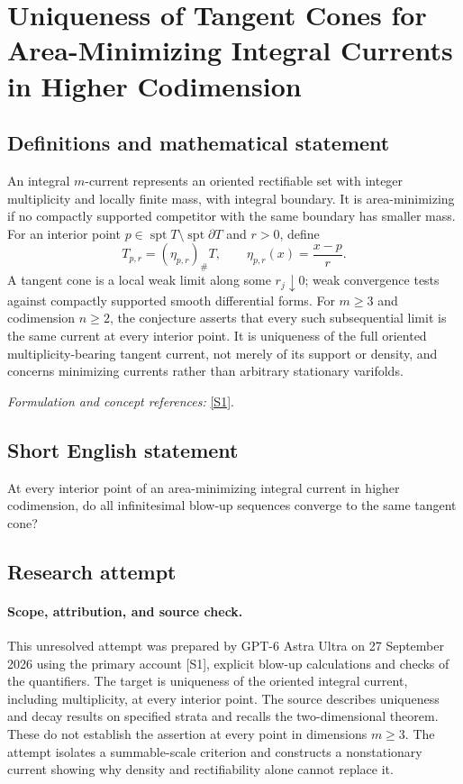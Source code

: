 \documentclass[11pt]{article}
\begin{document}
\section*{\texorpdfstring{Uniqueness of Tangent Cones for Area-Minimizing Integral Currents in Higher Codimension}{Uniqueness of Tangent Cones for Area-Minimizing Integral Currents in Higher Codimension}}\label{30006918}
\subsection{Definitions and mathematical statement}
An integral $m$-current represents an oriented rectifiable set with integer multiplicity and locally finite mass, with integral boundary. It is area-minimizing if no compactly supported competitor with the same boundary has smaller mass. For an interior point $p\in\operatorname{spt}T\setminus\operatorname{spt}\partial T$ and $r>0$, define
\[
 T_{p,r}=(\eta_{p,r})_\#T,
 \qquad\eta_{p,r}(x)=\frac{x-p}{r}.
\]
A tangent cone is a local weak limit along some $r_j\downarrow0$; weak convergence tests against compactly supported smooth differential forms. For $m\ge3$ and codimension $n\ge2$, the conjecture asserts that every such subsequential limit is the same current at every interior point. It is uniqueness of the full oriented multiplicity-bearing tangent current, not merely of its support or density, and concerns minimizing currents rather than arbitrary stationary varifolds.
\par\smallskip\textit{Formulation and concept references:} \href{https://proceedings.centre-mersenne.org/item/10.5802/slsedp.175.pdf}{[S1]}.

\subsection{Short English statement}
At every interior point of an area-minimizing integral current in higher codimension, do all infinitesimal blow-up sequences converge to the same tangent cone?
\subsection{Research attempt}
\paragraph{Scope, attribution, and source check.}
This unresolved attempt was prepared by GPT-6 Astra Ultra on 27 September
2026 using the primary account [S1], explicit blow-up calculations and
checks of the quantifiers. The target is uniqueness of the oriented
integral current, including multiplicity, at every interior point.
The source describes uniqueness and decay results on specified strata
and recalls the two-dimensional theorem. These do not establish the
assertion at every point in dimensions $m\geq3$. The attempt isolates
a summable-scale criterion and constructs a nonstationary current
showing why density and rectifiability alone cannot replace it.
\end{document}
